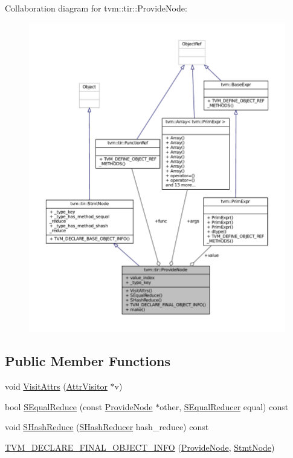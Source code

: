 Collaboration diagram for tvm\+:\+:tir\+:\+:Provide\+Node\+:
\nopagebreak
\begin{figure}[H]
\begin{center}
\leavevmode
\includegraphics[width=350pt]{classtvm_1_1tir_1_1ProvideNode__coll__graph}
\end{center}
\end{figure}
\subsection*{Public Member Functions}
\begin{DoxyCompactItemize}
\item 
void \hyperlink{classtvm_1_1tir_1_1ProvideNode_ad10005102ba52f0db2d5e4dd6aa78413}{Visit\+Attrs} (\hyperlink{classtvm_1_1AttrVisitor}{Attr\+Visitor} $\ast$v)
\item 
bool \hyperlink{classtvm_1_1tir_1_1ProvideNode_a946de6e2023bc71813f22d61860576fc}{S\+Equal\+Reduce} (const \hyperlink{classtvm_1_1tir_1_1ProvideNode}{Provide\+Node} $\ast$other, \hyperlink{classtvm_1_1SEqualReducer}{S\+Equal\+Reducer} equal) const 
\item 
void \hyperlink{classtvm_1_1tir_1_1ProvideNode_a44c1f3f0a5ccf7d53befc3b61c985692}{S\+Hash\+Reduce} (\hyperlink{classtvm_1_1SHashReducer}{S\+Hash\+Reducer} hash\+\_\+reduce) const 
\item 
\hyperlink{classtvm_1_1tir_1_1ProvideNode_ad4f570b59de8c382fcc0028d28f4f3f2}{T\+V\+M\+\_\+\+D\+E\+C\+L\+A\+R\+E\+\_\+\+F\+I\+N\+A\+L\+\_\+\+O\+B\+J\+E\+C\+T\+\_\+\+I\+N\+FO} (\hyperlink{classtvm_1_1tir_1_1ProvideNode}{Provide\+Node}, \hyperlink{classtvm_1_1tir_1_1StmtNode}{Stmt\+Node})
\end{DoxyCompactItemize}
